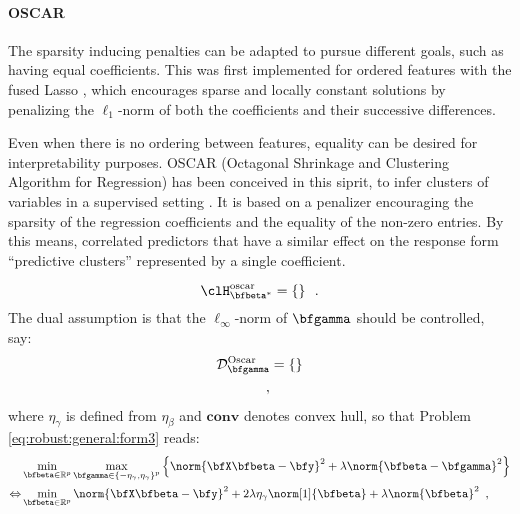 \paragraph{OSCAR}

The sparsity inducing penalties can be adapted to pursue different goals, such
as having equal coefficients.  This was first implemented for ordered features
with the fused Lasso \citep{Tibshirani05}, which encourages sparse and locally
constant solutions by penalizing the $\ell_1$-norm of both the coefficients and
their successive differences.

Even when there is no ordering between features, equality can be desired for
interpretability purposes.  OSCAR (Octagonal Shrinkage and Clustering Algorithm
for Regression) has been conceived in this siprit, to infer clusters of
variables in a supervised setting \citep{Bondell08}.
It is based on a penalizer encouraging the sparsity of the regression
coefficients and the equality of the non-zero entries.
By this means, correlated predictors that have a similar effect on the response
form ``predictive clusters'' represented by a single coefficient.



%
\begin{equation*}
  \clH^\mathrm{oscar}_{\bfbeta^*} = \left\{ 
\right\}
  \enspace.
\end{equation*}
%
The dual assumption is that the $\ell_\infty$-norm of $\bfgamma$ should be
controlled, say:
%
\begin{align*}
  \mathcal{D}^\mathrm{Oscar}_{\bfgamma} & = \left\{ 
\right\} \\
  \enspace,
\end{align*}
where $\eta_\gamma$ is defined from $\eta_\beta$ and $\mathbf{conv}$ denotes convex hull, so that Problem
\eqref{eq:robust:general:form3} reads:
%
\begin{align*}
  & \min_{\bfbeta\in\mathbb{R}^p} \max_{\bfgamma \in \left\{ -\eta_\gamma, \eta_\gamma \right\}^p}
      \Big\{ \norm{\bfX \bfbeta - \bfy}^2 + \lambda \norm{\bfbeta - \bfgamma}^2 \Big\} \\
  \Leftrightarrow
    & \min_{\bfbeta\in\mathbb{R}^p}
      \norm{\bfX \bfbeta - \bfy}^2 + 2 \lambda \eta_\gamma \norm[1]{\bfbeta} + \lambda \norm{\bfbeta}^2 
  \enspace,
\end{align*}


